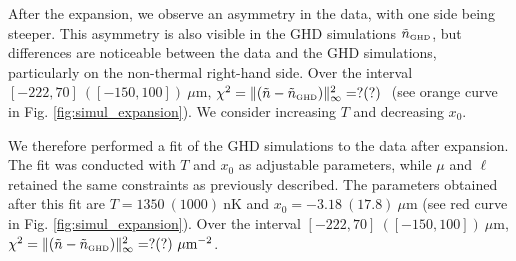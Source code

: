 \documentclass[submission, Phys]{SciPost}
\begin{document}
		
		
		After the expansion, we observe an asymmetry in the data, with one side being steeper. This asymmetry is also visible in the GHD simulations $\tilde{n}_{\mbox{\tiny GHD}}$, but differences are noticeable between the data and the GHD simulations, particularly on the non-thermal right-hand side. Over the interval $[-222 , 70] ~([-150 , 100])~\mu \mbox{m}$, $\chi^2 = \Vert (\tilde{n} - \tilde{n}_{\mbox{\tiny GHD}}) \Vert^2_\infty  = ? (?) ~$ (see orange curve in Fig. \ref{fig:simul_expansion}). We consider increasing $T$ and decreasing $x_0$.

		
		
		We therefore performed a fit of the GHD simulations to the data after expansion. The fit was conducted with $T$ and $x_0$ as adjustable parameters, while $\mu$ and $\ell$ retained the same constraints as previously described. The parameters obtained after this fit are $T = 1350~(1000)~\mbox{nK}$ and $x_0 = -3.18~(17.8)~\mu\mbox{m}$ (see red curve in Fig. \ref{fig:simul_expansion}). Over the interval $[-222, 70]~([-150, 100])~\mu \mbox{m}$, $\chi^2 = \Vert (\tilde{n} - \tilde{n}_{\mbox{\tiny GHD}}) \Vert^2_\infty  = ? (?)~\mu \text{m}^{-2}$.

		
		
\end{document}
